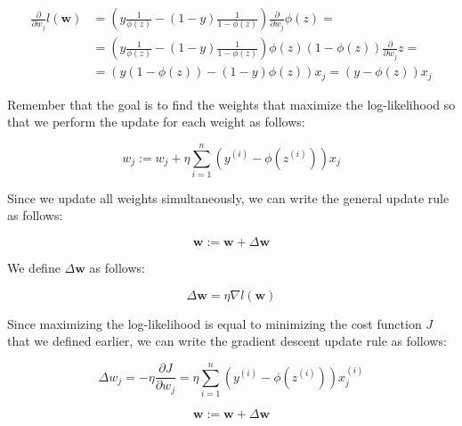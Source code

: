 \documentclass[11pt]{article}
\newcommand{\vect}[1]{\boldsymbol{#1}}
\newcommand{\pa}[1]{\partial{#1}}
\begin{document}
    \begin{equation}
        \label{eq:dloglike_dw_sol}
        \begin{split}
            \frac{ \partial } {\pa{w_j} } l(\vect{w}) & =
            \left( y \frac{1} {\phi(z)} - (1 - y) \frac{1} {1 - \phi(z)} \right) \frac{ \partial } {\pa{w_j}} \phi(z) = \\
            & = \left( y \frac{1} {\phi(z)} - (1 - y) \frac{1} {1 - \phi(z)} \right) \phi (z) (1 - \phi(z) ) \frac{ \partial } {\pa{w_j}} z = \\
            & = \left( y ( 1 - \phi (z) ) - (1 - y) \phi (z) \right) x_j = (y - \phi(z)) x_j
        \end{split}
    \end{equation}

    Remember that the goal is to find the weights that maximize the log-likelihood so that we perform the update for each weight as follows:

    \begin{equation}
        w_j :=
        w_j + \eta \sum \limits_{i=1}^n \left( y^{(i)} - \phi \left( z^{(i)} \right) \right) x_j
    \end{equation}

    Since we update all weights simultaneously, we can write the general update rule as follows:

    \begin{equation}
        \vect{w} := \vect{w} + \Delta \vect{w}
    \end{equation}

    We define $ \Delta \vect{w} $ as follows:

    \begin{equation}
        \Delta \vect{w} = \eta \nabla l( \vect{w} )
    \end{equation}

    Since maximizing the log-likelihood is equal to minimizing the cost function $J$ that we defined earlier, we can write the gradient descent update rule as follows:

    \begin{equation}
        \Delta w_j =
        - \eta \frac{\pa{J}} {\pa{w_j} } =
        \eta \sum \limits_{i=1}^n \left( y^{(i)} - \phi \left( z^{(i)} \right) \right) x^{(i)}_j
    \end{equation}

    \begin{equation}
        \vect{w} :=
        \vect{w} + \Delta \vect{w}
    \end{equation}
\end{document}
